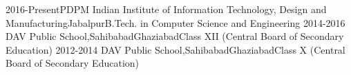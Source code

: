 

\begin{educations}
    \education
    {2016-Present}{PDPM Indian Institute of Information Technology, Design and Manufacturing}{Jabalpur}{B.Tech. in Computer Science and Engineering\hfill \color{accentcolor}{CPI - 8.1/10}}
    \medskip
    \education
    {2014-2016} {DAV Public School,Sahibabad}{Ghaziabad}{Class XII (Central Board of Secondary Education)\hfill \color{accentcolor}{Percentage - 94.6/100}}
    \medskip
    \education
    {2012-2014} {DAV Public School,Sahibabad}{Ghaziabad}{Class X (Central Board of Secondary Education)\hfill \color{accentcolor}{CGPA - 10/10}}
\end{educations}
